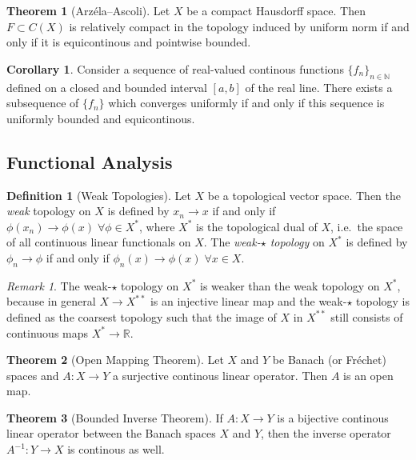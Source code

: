 \documentclass[a4paper]{article}
\newcommand{\RR}{\mathbb{R}}
\newcommand{\NN}{\mathbb{N}}
\newcommand{\lra}{\longrightarrow}
\theoremstyle{definition}
\newtheorem{thm}{Theorem}
\newtheorem{cor}{Corollary}
\theoremstyle{definition}
\newtheorem{definition}{Definition}
\theoremstyle{remark}
\newtheorem{rmk}{Remark}
\theoremstyle{remark}
\theoremstyle{remark}
\begin{document}
\begin{thm}[Arz\'ela--Ascoli]
  Let $X$ be a compact Hausdorff space. Then $F\subset C(X)$ is relatively compact in the topology induced by uniform norm if and only if it is equicontinous and pointwise bounded.
\end{thm}

\begin{cor}
  Consider a sequence of real-valued continous functions $\{f_n\}_{n\in\NN}$ defined on a closed and bounded interval $[a,b]$ of the real line. There exists a subsequence of $\{f_n\}$ which converges uniformly if and only if this sequence is uniformly bounded and equicontinous.
\end{cor}

\subsection{Functional Analysis}

\begin{definition}[Weak Topologies]
  Let $X$ be a topological vector space. Then the \emph{weak} topology on $X$ is defined by $x_n\lra x$ if and only if $\phi(x_n)\lra\phi(x)\;\forall\phi\in X^*$, where $X^*$ is the topological dual of $X$, i.e.\ the space of all continuous linear functionals on $X$. The \emph{weak-$\star$ topology} on $X^*$ is defined by $\phi_n\lra\phi$ if and only if $\phi_n(x)\lra\phi(x)\;\forall x\in X$.
\end{definition}

\begin{rmk}
  The weak-$\star$ topology on $X^*$ is weaker than the weak topology on $X^*$, because in general $X\lra X^{**}$ is an injective linear map and the weak-$\star$ topology is defined as the coarsest topology such that the image of $X$ in $X^{**}$ still consists of continuous maps $X^*\lra\RR$.
\end{rmk}

\begin{thm}[Open Mapping Theorem]
  Let $X$ and $Y$ be Banach (or Fr\'echet) spaces and $A:X\lra Y$ a surjective continous linear operator. Then $A$ is an open map.
\end{thm}

\begin{thm}[Bounded Inverse Theorem]
  If $A:X\lra Y$ is a bijective continous linear operator between the Banach spaces $X$ and $Y$, then the inverse operator $A^{-1}:Y\lra X$ is continous as well.
\end{thm}
\end{document}
